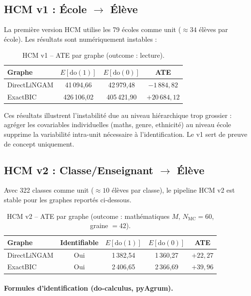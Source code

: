 \documentclass[11pt,a4paper]{article}
\newcommand{\rmdo}{\mathrm{do}}
\begin{document}
\subsection{HCM v1 : École $\to$ Élève}

La première version HCM utilise les 79 écoles comme unit ($\approx 34$ élèves par école). Les résultats sont numériquement instables :

\begin{table}[H]
\centering
\caption{HCM v1 -- ATE par graphe (outcome : lecture).}
\label{tab:hcm_v1}
\begin{tabular}{lccc}
\toprule
Graphe & $E[\rmdo(1)]$ & $E[\rmdo(0)]$ & ATE \\
\midrule
DirectLiNGAM  & 41\,094{,}66 & 42\,979{,}48 & $-1\,884{,}82$ \\
ExactBIC      & 426\,106{,}02 & 405\,421{,}90 & $+20\,684{,}12$ \\
\bottomrule
\end{tabular}
\end{table}

Ces résultats illustrent l'instabilité due au niveau hiérarchique trop grossier : agréger les covariables individuelles (maths, genre, ethnicité) au niveau école supprime la variabilité intra-unit nécessaire à l'identification. Le v1 sert de preuve de concept uniquement.

\subsection{HCM v2 : Classe/Enseignant $\to$ Élève}

Avec 322 classes comme unit ($\approx 10$ élèves par classe), le pipeline HCM v2 est stable pour les graphes reportés ci-dessous.

\begin{table}[H]
\centering
\caption{HCM v2 -- ATE par graphe (outcome : mathématiques $M$, $N_{\mathrm{MC}}=60$, graine $= 42$).}
\label{tab:hcm_v2}
\begin{tabular}{lcccc}
\toprule
Graphe & Identifiable & $E[\rmdo(1)]$ & $E[\rmdo(0)]$ & ATE \\
\midrule
DirectLiNGAM  & Oui & 1\,382{,}54 & 1\,360{,}27 & \textbf{$+22{,}27$} \\
ExactBIC      & Oui & 2\,406{,}65 & 2\,366{,}69 & \textbf{$+39{,}96$} \\
\bottomrule
\end{tabular}
\end{table}

\paragraph{Formules d'identification (do-calculus, pyAgrum).}
\end{document}
